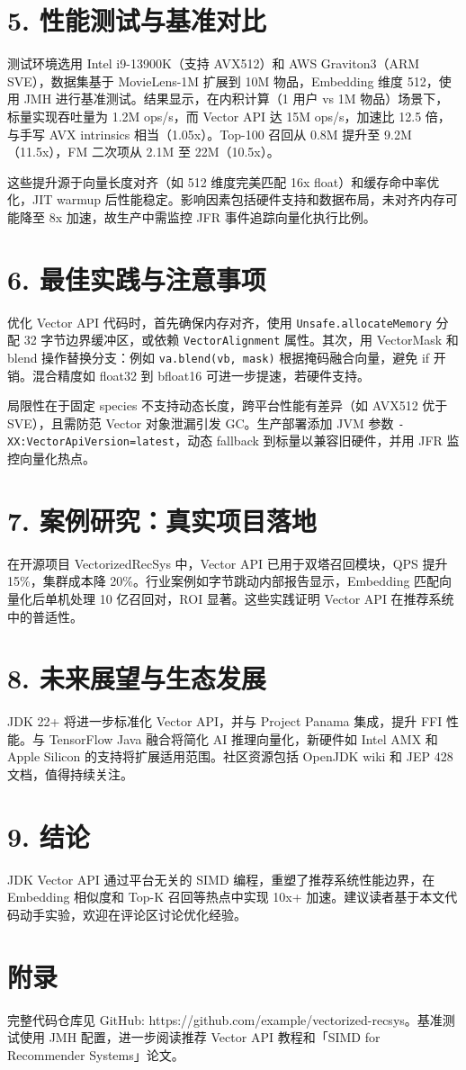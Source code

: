\chapter{5. 性能测试与基准对比}
测试环境选用 Intel i9-13900K（支持 AVX512）和 AWS Graviton3（ARM SVE），数据集基于 MovieLens-1M 扩展到 10M 物品，Embedding 维度 512，使用 JMH 进行基准测试。结果显示，在内积计算（1 用户 vs 1M 物品）场景下，标量实现吞吐量为 1.2M ops/s，而 Vector API 达 15M ops/s，加速比 12.5 倍，与手写 AVX intrinsics 相当（1.05x）。Top-100 召回从 0.8M 提升至 9.2M（11.5x），FM 二次项从 2.1M 至 22M（10.5x）。\par
这些提升源于向量长度对齐（如 512 维度完美匹配 16x float）和缓存命中率优化，JIT warmup 后性能稳定。影响因素包括硬件支持和数据布局，未对齐内存可能降至 8x 加速，故生产中需监控 JFR 事件追踪向量化执行比例。\par
\chapter{6. 最佳实践与注意事项}
优化 Vector API 代码时，首先确保内存对齐，使用 \texttt{Unsafe.allocateMemory} 分配 32 字节边界缓冲区，或依赖 \texttt{VectorAlignment} 属性。其次，用 VectorMask 和 blend 操作替换分支：例如 \texttt{va.blend(vb, mask)} 根据掩码融合向量，避免 if 开销。混合精度如 float32 到 bfloat16 可进一步提速，若硬件支持。\par
局限性在于固定 species 不支持动态长度，跨平台性能有差异（如 AVX512 优于 SVE），且需防范 Vector 对象泄漏引发 GC。生产部署添加 JVM 参数 \texttt{-XX:VectorApiVersion=latest}，动态 fallback 到标量以兼容旧硬件，并用 JFR 监控向量化热点。\par
\chapter{7. 案例研究：真实项目落地}
在开源项目 VectorizedRecSys 中，Vector API 已用于双塔召回模块，QPS 提升 15\%{}，集群成本降 20\%{}。行业案例如字节跳动内部报告显示，Embedding 匹配向量化后单机处理 10 亿召回对，ROI 显著。这些实践证明 Vector API 在推荐系统中的普适性。\par
\chapter{8. 未来展望与生态发展}
JDK 22+ 将进一步标准化 Vector API，并与 Project Panama 集成，提升 FFI 性能。与 TensorFlow Java 融合将简化 AI 推理向量化，新硬件如 Intel AMX 和 Apple Silicon 的支持将扩展适用范围。社区资源包括 OpenJDK wiki 和 JEP 428 文档，值得持续关注。\par
\chapter{9. 结论}
JDK Vector API 通过平台无关的 SIMD 编程，重塑了推荐系统性能边界，在 Embedding 相似度和 Top-K 召回等热点中实现 10x+ 加速。建议读者基于本文代码动手实验，欢迎在评论区讨论优化经验。\par
\chapter{附录}
完整代码仓库见 GitHub: https://github.com/example/vectorized-recsys。基准测试使用 JMH 配置，进一步阅读推荐 Vector API 教程和「SIMD for Recommender Systems」论文。\par
